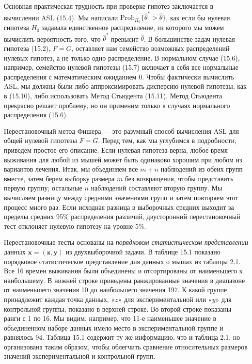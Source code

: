 Основная практическая трудность при проверке гипотез заключается в вычислении ASL (15.4). Мы написали $\text{Prob}_{H_0} \{ \hat{\theta}^* > \hat{\theta} \}$, как если бы нулевая гипотеза $H_0$ задавала единственное распределение, из которого мы можем вычислить вероятность того, что $\hat{\theta}^*$ превысит $\hat{\theta}$. В большинстве задач нулевая гипотеза (15.2), $F = G$, оставляет нам семейство возможных распределений нулевых гипотез, а не только одно распределение. В нормальном случае (15.6), например, семейство нулевой гипотезы (15.7) включает в себя все нормальные распределения с математическим ожиданием 0. Чтобы фактически вычислить ASL, мы должны были либо аппроксимировать дисперсию нулевой гипотезы, как в (15.10), либо использовать Метод Стьюдента (15.11). Метод Стьюдента прекрасно решает проблему, но он применим только в случаях нормального распределения (15.6).

Перестановочный метод Фишера --- это разумный способ вычисления ASL для общей нулевой гипотезы $F = G$. Перед тем, как мы углубимся в подробности, приведем простое его описание. Если нулевая гипотеза верна, любое время выживания для любой из мышей может быть одинаково хорошим при любом из вариантов лечения. Итак, мы объединяем все $m + n$ наблюдений из обеих групп вместе, затем берем выборку размера $m$ без возвращения, чтобы представить первую группу; остальные $n$ наблюдений составляют вторую группу. Мы вычисляем разницу между средними значениями групп и затем повторяем этот процесс много раз. Если исходная разница в выборочных средних выходит за пределы средних 95\% распределения различий, двусторонний перестановочный тест отклоняет нулевую гипотезу на уровне 5\%.

Перестановочные тесты основаны на \textit{порядковом статистическом представлении} данных $\textbf{x} = (\textbf{z}, \textbf{y})$ из двухвыборочной задачи. В таблице 15.1 показано порядковое статистическое представление для данных о мышах из таблицы 2.1. Все 16 времен выживания были объединены и отсортированы от наименьшего к наибольшему. В нижней строке приведены ранжированные значения в диапазоне от наименьшего значения 10 до наибольшего значения 197. К какой группе принадлежит каждая точка данных, «$z$» для экспериментальной или «$y$» для контрольной группы, показано в верхней строке. Во второй строке показаны ранги с 1 по 16. Мы видим, например, что 11-е наименьшее значение в объединенном наборе данных имело место в экспериментальной группе и равнялось 94. Таблица 15.1 содержит ту же информацию, что и таблица 2.1, но организована таким образом, чтобы облегчить сравнение относительных размеров значений экспериментальной и контрольной групп.

